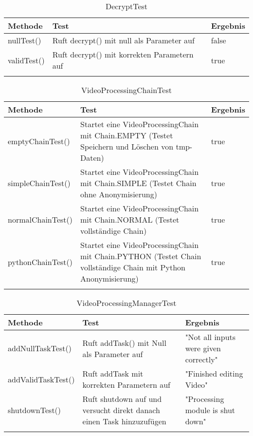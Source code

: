  \begin{longtable}{p{} | p{} | p{}}
\hline
   \textbf{Methode} & \textbf{Test} & \textbf{Ergebnis}\\
  \hline
  nullTest() & Ruft decrypt() mit null als Parameter auf & false\\
  \hline
  validTest() & Ruft decrypt() mit korrekten Parametern auf & true\\
  \hline 
  \caption{DecryptTest}
 \end{longtable}
 
 \begin{longtable}{p{} | p{} | p{}}
\hline
  \textbf{Methode} & \textbf{Test} & \textbf{Ergebnis}\\
  \hline
  emptyChainTest() & Startet eine VideoProcessingChain mit Chain.EMPTY (Testet Speichern und Löschen von tmp-Daten) & true\\
  \hline
  simpleChainTest() & Startet eine VideoProcessingChain mit Chain.SIMPLE (Testet Chain ohne Anonymisierung) & true\\
  \hline
  normalChainTest() & Startet eine VideoProcessingChain mit Chain.NORMAL (Testet vollständige Chain) & true\\
  \hline
  pythonChainTest() & Startet eine VideoProcessingChain mit Chain.PYTHON (Testet Chain vollständige Chain mit Python Anonymisierung) & true\\
  \hline
  \caption{VideoProcessingChainTest}
 \end{longtable}
 
 \begin{longtable}{p{} | p{} | p{}}
\hline
  \textbf{Methode} & \textbf{Test} & \textbf{Ergebnis}\\
  \hline
  addNullTaskTest() & Ruft addTask() mit Null als Parameter auf & "Not all inputs were given correctly"\\
  \hline
  addValidTaskTest() & Ruft addTask mit korrekten Parametern auf & "Finished editing Video"\\
  \hline
  shutdownTest() & Ruft shutdown auf und versucht direkt danach einen Task hinzuzufügen & "Processing module is shut down"\\
  \hline
  \caption{VideoProcessingManagerTest}
 \end{longtable}